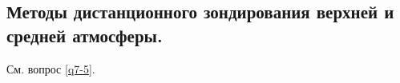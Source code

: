 \subsection{Методы дистанционного зондирования верхней и средней атмосферы.}
См. вопрос \ref{q7-5}.
